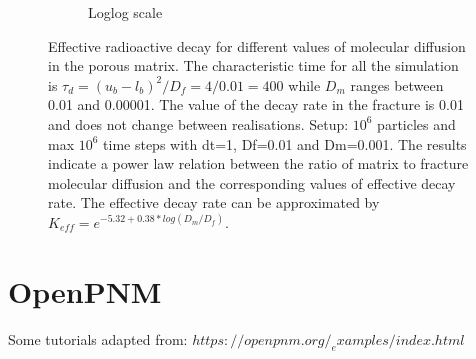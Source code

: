 \documentclass{article}
\begin{document}
\begin{figure}[htbp]
\begin{subfigure}[b]{0.48\textwidth}
        \caption{Loglog scale}
    \end{subfigure}
    \caption{Effective radioactive decay for different values of molecular diffusion in the porous matrix. The characteristic time for all the simulation is $\tau_d=(u_b-l_b)^2/D_f=4/0.01=400$ while $D_m$ ranges between 0.01 and 0.00001. The value of the decay rate in the fracture is 0.01 and does not change between realisations. Setup: $10^6$ particles and max $10^6$ time steps with dt=1, Df=0.01 and Dm=0.001. The results indicate a power law relation between the ratio of matrix to fracture molecular diffusion and the corresponding values of effective decay rate. The effective decay rate can be approximated by $K_{eff} = e^{-5.32+0.38*log(D_m/D_f)}$.}
    \label{fig:KeffVsDm}
\end{figure}

\FloatBarrier  %
\section{OpenPNM}
Some tutorials adapted from: $https://openpnm.org/_examples/index.html$
\end{document}
